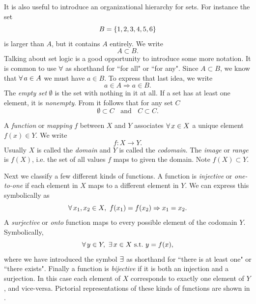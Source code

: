 It is also useful to introduce an organizational hierarchy for sets. For
instance the set
\begin{equation}
  B=\left\{1,2,3,4,5,6\right\}
\end{equation}
is larger than $A$, but it contains $A$ entirely. We write
\begin{equation}
A\subset B.
\end{equation}
Talking about set logic is a good opportunity to introduce some more notation.
It is common to use $\operatorname{\forall}$ as shorthand for ``for all" or ``for any".
Since $A\subset B$, we know that $\operatorname{\forall} a\in A$ we must have $a\in B$.
To express that last idea, we write
\begin{equation}\label{eq:subsetIn}
a\in A\Rightarrow a\in B.
\end{equation}
The {\it empty set} $\emptyset$ is the set with nothing in it
at all. If a set has at least one element, it is {\it nonempty}.
From  it follows that for any set $C$
\begin{equation}
\emptyset\subset C~~~~\text{and}~~~~C\subset C.
\end{equation}


A {\it function} or {\it mapping} $f$ between $X$ and $Y$
associates $\operatorname{\forall} x\in X$ a unique element $f(x)\in Y$. We
write
\begin{equation}
f:X\to Y.
\end{equation}
Usually $X$ is called the {\it domain}
and $Y$ is called the {\it codomain}.
The {\it image} or {\it range}
is $f(X)$, i.e. the set of all values $f$
maps to given the domain. Note $f(X)\subset Y$.

Next we classify a few different kinds of functions.
A function is {\it injective}
or {\it one-to-one} if each element in $X$
maps to a different element in $Y$. We can express this symbolically as
\begin{equation}
 \operatorname{\forall} x_1,x_2\in X,~f(x_1)=f(x_2)\Rightarrow x_1=x_2.
\end{equation}
A {\it surjective} or {\it onto} function
maps to every possible element of the codomain $Y$. Symbolically,
\begin{equation}
 \operatorname{\forall} y\in Y,~\operatorname{\exists} x\in X ~\text{s.t.}~ y=f(x), 
\end{equation}
where we have introduced the symbol $\operatorname{\exists}$ as shorthand for ``there is at
least one" or ``there exists". Finally a function is {\it bijective} if it is both an injection and a surjection. In this case each
element of $X$ corresponds to exactly one element of $Y$, and vice-versa.
Pictorial representations of these kinds of functions are shown in
.



